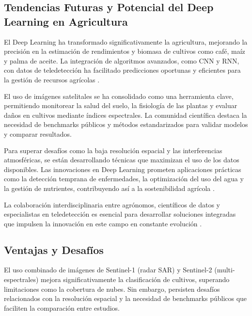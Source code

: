 \subsection{Tendencias Futuras y Potencial del Deep Learning en Agricultura}

El Deep Learning ha transformado significativamente la agricultura, mejorando la precisión en la estimación de rendimientos y biomasa de cultivos como café, maíz y palma de aceite. La integración de algoritmos avanzados, como CNN y RNN, con datos de teledetección ha facilitado predicciones oportunas y eficientes para la gestión de recursos agrícolas \cite{condran2022}.

El uso de imágenes satelitales se ha consolidado como una herramienta clave, permitiendo monitorear la salud del suelo, la fisiología de las plantas y evaluar daños en cultivos mediante índices espectrales. La comunidad científica destaca la necesidad de benchmarks públicos y métodos estandarizados para validar modelos y comparar resultados.

Para superar desafíos como la baja resolución espacial y las interferencias atmosféricas, se están desarrollando técnicas que maximizan el uso de los datos disponibles. Las innovaciones en Deep Learning prometen aplicaciones prácticas como la detección temprana de enfermedades, la optimización del uso del agua y la gestión de nutrientes, contribuyendo así a la sostenibilidad agrícola \cite{sepulveda2020}.

La colaboración interdisciplinaria entre agrónomos, científicos de datos y especialistas en teledetección es esencial para desarrollar soluciones integradas que impulsen la innovación en este campo en constante evolución \cite{nasa_arset_2023}.

\subsection{Ventajas y Desafíos}

El uso combinado de imágenes de Sentinel-1 (radar SAR) y Sentinel-2 (multi-espectrales) mejora significativamente la clasificación de cultivos, superando limitaciones como la cobertura de nubes. Sin embargo, persisten desafíos relacionados con la resolución espacial y la necesidad de benchmarks públicos que faciliten la comparación entre estudios.

